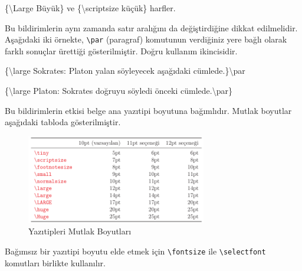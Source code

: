 \documentclass[
  10pt,
]{scrbook}
\newenvironment{Shaded}{\begin{snugshade}}{\end{snugshade}}
\newcommand{\FunctionTok}[1]{\textcolor[rgb]{0.00,0.00,0.00}{#1}}
\newcommand{\NormalTok}[1]{#1}
\theoremstyle{definition}
\theoremstyle{definition}
\theoremstyle{definition}
\theoremstyle{definition}
\theoremstyle{remark}
\begin{document}
\begin{Shaded}
\begin{Highlighting}[]
\NormalTok{\{}\FunctionTok{\textbackslash{}Large}\NormalTok{ Büyük\} ve}
\NormalTok{\{}\FunctionTok{\textbackslash{}scriptsize}\NormalTok{ küçük\} harfler.}
\end{Highlighting}
\end{Shaded}

Bu bildirimlerin aynı zamanda satır aralığını da değiştirdiğine dikkat edilmelidir. Aşağıdaki iki örnekte, \texttt{\textbackslash{}par} (paragraf) komutunun verdiğiniz yere bağlı olarak farklı sonuçlar ürettiği gösterilmiştir. Doğru kullanım ikincisidir.

\begin{Shaded}
\begin{Highlighting}[]
\NormalTok{\{}\FunctionTok{\textbackslash{}large} 
\NormalTok{Sokrates: Platon}
\NormalTok{yalan söyleyecek}
\NormalTok{aşağıdaki cümlede.\}}\FunctionTok{\textbackslash{}par}
\end{Highlighting}
\end{Shaded}

\begin{Shaded}
\begin{Highlighting}[]
\NormalTok{\{}\FunctionTok{\textbackslash{}large}\NormalTok{ Platon: Sokrates}
\NormalTok{doğruyu söyledi}
\NormalTok{önceki cümlede.}\FunctionTok{\textbackslash{}par}\NormalTok{\}}
\end{Highlighting}
\end{Shaded}

Bu bildirimlerin etkisi belge ana yazıtipi boyutuna bağımlıdır. Mutlak boyutlar aşağıdaki tabloda gösterilmiştir.

\begin{figure}
\centering
\includegraphics[width=0.7\textwidth,height=\textheight]{images/yazitipi9.png}
\caption{Yazıtipleri Mutlak Boyutları}
\end{figure}

Bağımsız bir yazıtipi boyutu elde etmek için \texttt{\textbackslash{}fontsize} ile \texttt{\textbackslash{}selectfont} komutları birlikte kullanılır.
\end{document}
